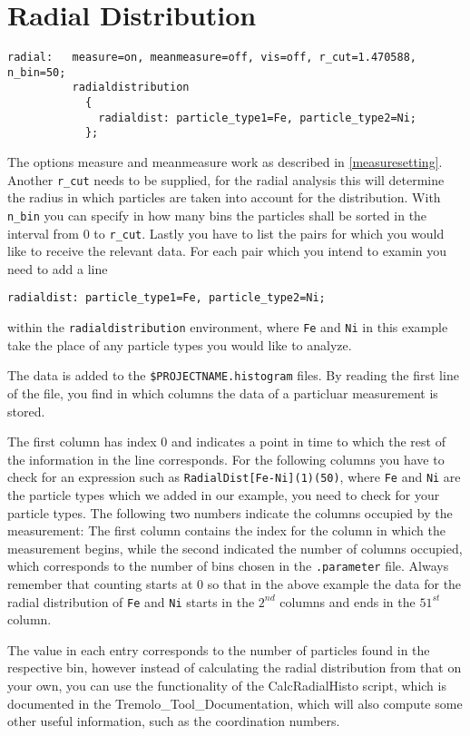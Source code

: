 \section{Radial Distribution}
\label{section:radialDistribution}

\begin{lstlisting}
radial:   measure=on, meanmeasure=off, vis=off, r_cut=1.470588, n_bin=50;
          radialdistribution 
            {
              radialdist: particle_type1=Fe, particle_type2=Ni;
            };
\end{lstlisting}

The options measure and meanmeasure work as described in \ref{measuresetting}.
Another {\tt r\_cut} needs to be supplied, for the radial analysis this will determine the radius in which particles are taken into account for the distribution. With {\tt n\_bin} you can specify in how many bins the particles shall be sorted in the interval from 0 to {\tt r\_cut}. Lastly you have to list the pairs for which you would like to receive the relevant data. For each pair which you intend to examin you need to add a line 
\begin{lstlisting}
radialdist: particle_type1=Fe, particle_type2=Ni;
\end{lstlisting}
within the {\tt radialdistribution} environment, where {\tt Fe} and {\tt Ni} in this example take the place of any particle types you would like to analyze.

The data is added to the {\tt\$PROJECTNAME.histogram} files. By reading the first line of the file, you find in which columns the data of a particluar measurement is stored. 

The first column has index 0 and indicates a point in time to which the rest of the information in the line corresponds. For the following columns you have to check for an expression such as {\tt RadialDist[Fe-Ni](1)(50)}, where {\tt Fe} and {\tt Ni} are the particle types which we added in our example, you need to check for your particle types. The following two numbers indicate the columns occupied by the measurement: The first column contains the index for the column in which the measurement begins, while the second indicated the number of columns occupied, which corresponds to the number of bins chosen in the {\tt .parameter} file. Always remember that counting starts at 0 so that in the above example the data for the radial distribution of {\tt Fe} and {\tt Ni} starts in the $2^{nd}$ columns and ends in the $51^{st}$ column.

The value in each entry corresponds to the number of particles found in the respective bin, however instead of calculating the radial distribution from that on your own, you can use the functionality of the CalcRadialHisto script, which is documented in the Tremolo\_Tool\_Documentation, which will also compute some other useful information, such as the coordination numbers.


